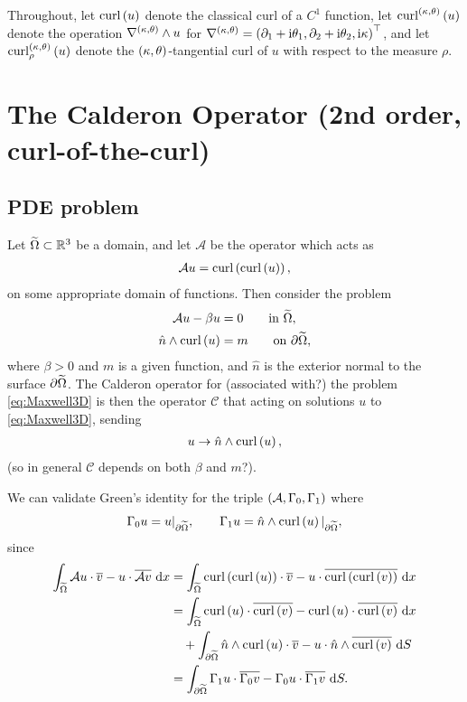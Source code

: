 \documentclass[11pt]{report}
\renewcommand{\curl}[1]{\mathrm{curl}\bracs{#1}}
\renewcommand{\ktcurl}[1]{\mathrm{curl}^{\kt}\bracs{#1}}
\newcommand{\ktdcurl}[2]{\mathrm{curl}^{\kt}_{#1}\bracs{#2}}
\begin{document}
Throughout, let $\curl{u}$ denote the classical curl of a $C^1$ function, let $\ktcurl{u}$ denote the operation $\nabla^{\left( \kappa, \theta \right)}\wedge u$ for $\nabla^{\left( \kappa, \theta \right)} = \left(  \partial_1 + \mathrm{i}\theta_1, \partial_2 + \mathrm{i}\theta_2, \mathrm{i}\kappa \right)^\top$, and let $\ktdcurl{\rho}{u}$ denote the $\left( \kappa, \theta \right)$-tangential curl of $u$ with respect to the measure $\rho$.

\section*{The Calderon Operator (2nd order, curl-of-the-curl)}

\subsection*{PDE problem}
Let $\widetilde{\Omega}\subset\mathbb{R}^3$ be a domain, and let $\mathcal{A}$ be the operator which acts as
\begin{align*}
	\mathcal{A}u = \curl{\curl{u}},
\end{align*}
on some appropriate domain of functions.
Then consider the problem
\begin{subequations} \label{eq:Maxwell3D}
\begin{align} 
	\mathcal{A}u - \beta u &= 0 \qquad\text{in } \dddom, \\
	\hat{n}\wedge\curl{u} &= m \qquad\text{on } \partial\dddom,
\end{align}
\end{subequations}
where $\beta>0$ and $m$ is a given function, and $\hat{n}$ is the exterior normal to the surface $\partial\widetilde{\Omega}$.
The Calderon operator for (associated with?) the problem \eqref{eq:Maxwell3D} is then the operator $\mathcal{C}$ that acting on solutions $u$ to \eqref{eq:Maxwell3D}, sending
\begin{align*}
	u \rightarrow \hat{n}\wedge\curl{u},
\end{align*}
(so in general $\mathcal{C}$ depends on both $\beta$ and $m$?).

We can validate Green's identity for the triple $\left( \mathcal{A}, \Gamma_0, \Gamma_1 \right)$ where
\begin{align*}
	\dmap u = u\vert_{\partial\dddom}, \qquad
	\nmap u = \hat{n}\wedge\curl{u}\vert_{\partial\dddom},
\end{align*}
since
\begin{align*}
	\integral{\dddom}{ \mathcal{A}u \cdot \overline{v} - u \cdot \overline{\mathcal{A}v} }{x}
	&= \integral{\dddom}{ \curl{\curl{u}}\cdot\overline{v} - u\cdot\overline{\curl{\curl{v}}} }{x} \\
	&= \integral{\dddom}{ \curl{u}\cdot\overline{\curl{v}} - \curl{u}\cdot\overline{\curl{v}} }{x} \\
	&\quad + \integral{\partial\dddom}{ \hat{n}\wedge\curl{u}\cdot\overline{v} - u\cdot\hat{n}\wedge\overline{\curl{v}} }{S} \\
	&= \integral{\partial\dddom}{ \nmap u \cdot \overline{\dmap v} - \dmap u \cdot \overline{\nmap v} }{S}.
\end{align*}
\end{document}
